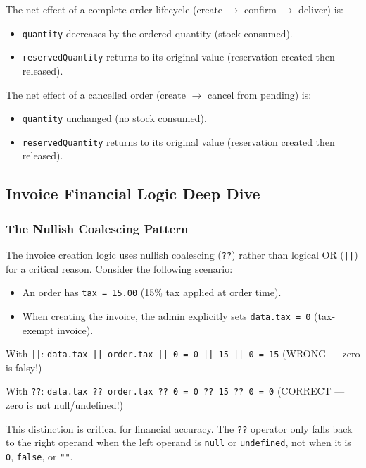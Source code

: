 \documentclass[12pt,onecolumn]{IEEEtran}
\begin{document}
The net effect of a complete order lifecycle (create $\to$ confirm $\to$ deliver) is:
\begin{itemize}[leftmargin=1.5em]
  \item \texttt{quantity} decreases by the ordered quantity (stock consumed).
  \item \texttt{reservedQuantity} returns to its original value (reservation created then released).
\end{itemize}

The net effect of a cancelled order (create $\to$ cancel from pending) is:
\begin{itemize}[leftmargin=1.5em]
  \item \texttt{quantity} unchanged (no stock consumed).
  \item \texttt{reservedQuantity} returns to its original value (reservation created then released).
\end{itemize}

\subsection{Invoice Financial Logic Deep Dive}

\subsubsection{The Nullish Coalescing Pattern}

The invoice creation logic uses nullish coalescing (\texttt{??}) rather than logical OR (\texttt{||}) for a critical reason. Consider the following scenario:

\begin{itemize}[leftmargin=1.5em]
  \item An order has \texttt{tax = 15.00} (15\% tax applied at order time).
  \item When creating the invoice, the admin explicitly sets \texttt{data.tax = 0} (tax-exempt invoice).
\end{itemize}

With \texttt{||}: \texttt{data.tax || order.tax || 0 = 0 || 15 || 0 = 15} (WRONG --- zero is falsy!)

With \texttt{??}: \texttt{data.tax ?? order.tax ?? 0 = 0 ?? 15 ?? 0 = 0} (CORRECT --- zero is not null/undefined!)

This distinction is critical for financial accuracy. The \texttt{??} operator only falls back to the right operand when the left operand is \texttt{null} or \texttt{undefined}, not when it is \texttt{0}, \texttt{false}, or \texttt{""}.
\end{document}
